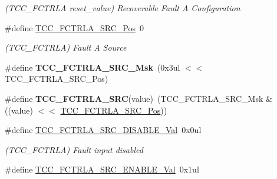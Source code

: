 \begin{DoxyCompactItemize}
\begin{DoxyCompactList}\small\item\em (T\+C\+C\+\_\+\+F\+C\+T\+R\+L\+A reset\+\_\+value) Recoverable Fault A Configuration \end{DoxyCompactList}\item 
\hypertarget{group___s_a_m_l21___t_c_c_ga402acbd670b494207ddf863d2b4235e3}{}\#define \hyperlink{group___s_a_m_l21___t_c_c_ga402acbd670b494207ddf863d2b4235e3}{T\+C\+C\+\_\+\+F\+C\+T\+R\+L\+A\+\_\+\+S\+R\+C\+\_\+\+Pos}~0\label{group___s_a_m_l21___t_c_c_ga402acbd670b494207ddf863d2b4235e3}

\begin{DoxyCompactList}\small\item\em (T\+C\+C\+\_\+\+F\+C\+T\+R\+L\+A) Fault A Source \end{DoxyCompactList}\item 
\hypertarget{group___s_a_m_l21___t_c_c_ga01bb9075d01957d4ea7b34b72cc54990}{}\#define {\bfseries T\+C\+C\+\_\+\+F\+C\+T\+R\+L\+A\+\_\+\+S\+R\+C\+\_\+\+Msk}~(0x3ul $<$$<$ T\+C\+C\+\_\+\+F\+C\+T\+R\+L\+A\+\_\+\+S\+R\+C\+\_\+\+Pos)\label{group___s_a_m_l21___t_c_c_ga01bb9075d01957d4ea7b34b72cc54990}

\item 
\hypertarget{group___s_a_m_l21___t_c_c_ga7d7a6da73a988a4b761b8e067b39cb83}{}\#define {\bfseries T\+C\+C\+\_\+\+F\+C\+T\+R\+L\+A\+\_\+\+S\+R\+C}(value)~(T\+C\+C\+\_\+\+F\+C\+T\+R\+L\+A\+\_\+\+S\+R\+C\+\_\+\+Msk \& ((value) $<$$<$ \hyperlink{group___s_a_m_l21___t_c_c_ga402acbd670b494207ddf863d2b4235e3}{T\+C\+C\+\_\+\+F\+C\+T\+R\+L\+A\+\_\+\+S\+R\+C\+\_\+\+Pos}))\label{group___s_a_m_l21___t_c_c_ga7d7a6da73a988a4b761b8e067b39cb83}

\item 
\hypertarget{group___s_a_m_l21___t_c_c_ga637d8bf25f0c4aed04b57684d4c00311}{}\#define \hyperlink{group___s_a_m_l21___t_c_c_ga637d8bf25f0c4aed04b57684d4c00311}{T\+C\+C\+\_\+\+F\+C\+T\+R\+L\+A\+\_\+\+S\+R\+C\+\_\+\+D\+I\+S\+A\+B\+L\+E\+\_\+\+Val}~0x0ul\label{group___s_a_m_l21___t_c_c_ga637d8bf25f0c4aed04b57684d4c00311}

\begin{DoxyCompactList}\small\item\em (T\+C\+C\+\_\+\+F\+C\+T\+R\+L\+A) Fault input disabled \end{DoxyCompactList}\item 
\hypertarget{group___s_a_m_l21___t_c_c_gada46b94ac2cebcd63adfb378f164d6ca}{}\#define \hyperlink{group___s_a_m_l21___t_c_c_gada46b94ac2cebcd63adfb378f164d6ca}{T\+C\+C\+\_\+\+F\+C\+T\+R\+L\+A\+\_\+\+S\+R\+C\+\_\+\+E\+N\+A\+B\+L\+E\+\_\+\+Val}~0x1ul\label{group___s_a_m_l21___t_c_c_gada46b94ac2cebcd63adfb378f164d6ca}


\end{DoxyCompactItemize}
